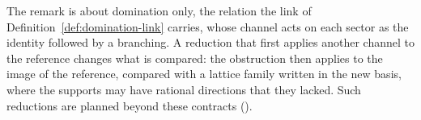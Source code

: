 
The remark is about domination only, the relation the link of
Definition~\ref{def:domination-link} carries, whose channel acts on each
sector as the identity followed by a branching. A reduction that first
applies another channel to the reference changes what is compared: the
obstruction then applies to the image of the reference, compared with a
lattice family written in the new basis, where the supports may have
rational directions that they lacked. Such reductions are planned beyond
these contracts ().

